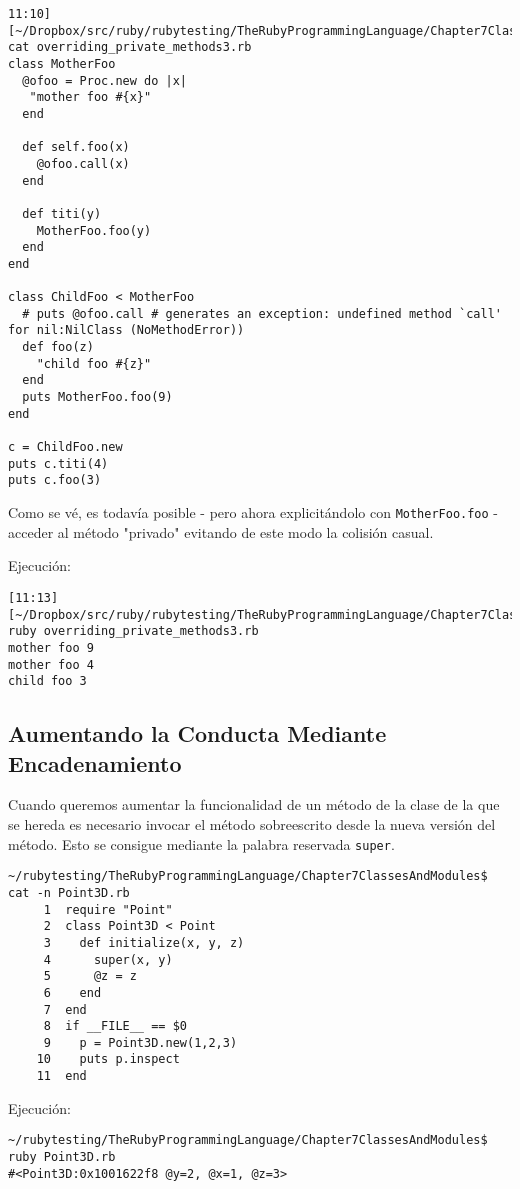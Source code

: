 \begin{verbatim}
11:10][~/Dropbox/src/ruby/rubytesting/TheRubyProgrammingLanguage/Chapter7ClassesAndModules]$ cat overriding_private_methods3.rb 
class MotherFoo
  @ofoo = Proc.new do |x|
   "mother foo #{x}"
  end

  def self.foo(x)
    @ofoo.call(x)
  end

  def titi(y) 
    MotherFoo.foo(y) 
  end
end

class ChildFoo < MotherFoo
  # puts @ofoo.call # generates an exception: undefined method `call' for nil:NilClass (NoMethodError))
  def foo(z) 
    "child foo #{z}"
  end
  puts MotherFoo.foo(9)
end

c = ChildFoo.new
puts c.titi(4) 
puts c.foo(3) 
\end{verbatim}
Como se vé, es todavía posible - pero ahora explicitándolo con \verb|MotherFoo.foo| - acceder al método "privado"
evitando de este modo la colisión casual.

Ejecución:
\begin{verbatim}
[11:13][~/Dropbox/src/ruby/rubytesting/TheRubyProgrammingLanguage/Chapter7ClassesAndModules]$ ruby overriding_private_methods3.rb 
mother foo 9
mother foo 4
child foo 3
\end{verbatim}

\subsection{Aumentando la Conducta Mediante Encadenamiento}

Cuando queremos aumentar la funcionalidad de un método de la clase de la que se hereda
es necesario invocar el método sobreescrito desde la nueva versión del  método.
Esto se consigue mediante la palabra reservada \verb|super|.
\begin{verbatim}
~/rubytesting/TheRubyProgrammingLanguage/Chapter7ClassesAndModules$ cat -n Point3D.rb 
     1  require "Point"
     2  class Point3D < Point
     3    def initialize(x, y, z)
     4      super(x, y)
     5      @z = z
     6    end
     7  end
     8  if __FILE__ == $0
     9    p = Point3D.new(1,2,3)
    10    puts p.inspect
    11  end
\end{verbatim}

Ejecución:
\begin{verbatim}
~/rubytesting/TheRubyProgrammingLanguage/Chapter7ClassesAndModules$ ruby Point3D.rb 
#<Point3D:0x1001622f8 @y=2, @x=1, @z=3>
\end{verbatim}

